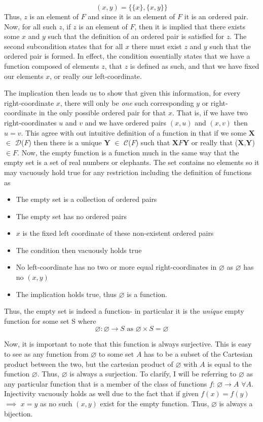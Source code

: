 \documentclass{article}
\begin{document}
\[
(x,y) = \{\{x\}, \{x,y\}\}
\]
Thus, $z$ is an element of $F$ and since it is an element of $F$ it is an ordered pair. Now, for all such $z$, if $z$ is an element of $F$, then it is implied that there exists some $x$ and $y$ such that the definition of an ordered pair is satisfied for $z$. The second subcondition states that for all $x$ there must exist $z$ and $y$ such that the ordered pair is formed. In effect, the condition essentially states that we have a function composed of elements $z$, that $z$ is defined as such, and that we have fixed our elements $x$, or really our left-coordinate.
\par The implication then leads us to show that given this information, for every right-coordinate $x$, there will only be \textit{one} such corresponding $y$ or right-coordinate in the only possible ordered pair for that $x$. That is, if we have two right-coordinates $u$ and $v$ and we have ordered pairs $(x,u)$ and $(x,v)$ then $u=v$. This agree with out intuitive definition of a function in that if we some $\mathbf{X}$ $\in$ $\mathcal{D}$($F$) then there is a unique $\mathbf{Y}$ $\in$ $\mathcal{C}$($F$) such that $\mathbf{X}$$F$$\mathbf{Y}$ or really that ($\mathbf{X}$,$\mathbf{Y}$) $\in F$. Now, the empty function is a function much in the same way that the empty set is a set of real numbers or elephants. The set contains no elements so it may vacuously hold true for any restriction including the definition of functions as 
\begin{itemize}
\item The empty set is a collection of ordered pairs
\item The empty set has no ordered pairs
\item $x$ is the fixed left coordinate of these non-existent ordered pairs
\item The condition then vacuously holds true
\item No left-coordinate has no two or more equal right-coordinates in $\varnothing$ as $\varnothing$ has no $(x,y)$
\item The implication holds true, thus $\varnothing$ is a function.
\end{itemize}
\par Thus, the empty set is indeed a function- in particular it is the \textit{unique} empty function for some set S where
\[
\varnothing: \varnothing \to S \text{ as } \varnothing \times S = \varnothing
\]
\par Now, it is important to note that this function is always surjective. This is easy to see as any function from $\varnothing$ to some set $A$ has to be a subset of the Cartesian product between the two, but the cartesian product of $\varnothing$ with $A$ is equal to the function $\varnothing$. Thus, $\varnothing$ is always a surjection. To clarify, I will be referring to $\varnothing$ as any particular function that is a member of the class of functions $f$: $\varnothing \to A$ \text{} $\forall A$. Injectivity vacuously holds as well due to the fact that if given $f(x)=f(y)$ $\implies$ $x=y$ as no such $(x,y)$ exist for the empty function. Thus, $\varnothing$ is always a bijection. 
\end{document}
